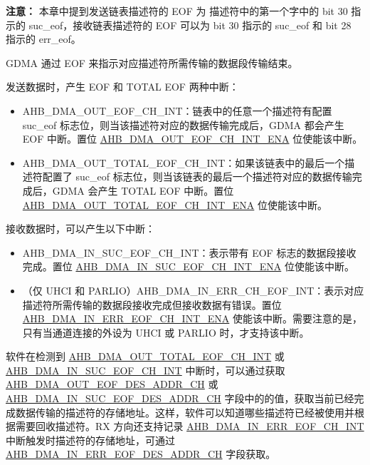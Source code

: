 \documentclass[main\_\_CN.tex]{subfiles}
\begin{document}
{\bfseries 注意：} 本章中提到发送链表描述符的 EOF 为 描述符中的第一个字中的 bit 30 指示的 suc\_eof，接收链表描述符的 EOF 可以为 bit 30 指示的 suc\_eof 和 bit 28 指示的 err\_eof。

GDMA 通过 EOF 来指示对应描述符所需传输的数据段传输结束。

发送数据时，产生 EOF 和 TOTAL EOF 两种中断：
\begin{itemize}
    \item AHB\_DMA\_OUT\_EOF\_CH\_INT：链表中的任意一个描述符有配置 suc\_eof 标志位，则当该描述符对应的数据传输完成后，GDMA 都会产生 EOF 中断。置位 \hyperref[fielddesc:AHBDMAOUTEOFCHNINTENA]{AHB\_DMA\_OUT\_EOF\_CH\_INT\_ENA} 位使能该中断。
    \item AHB\_DMA\_OUT\_TOTAL\_EOF\_CH\_INT：如果该链表中的最后一个描述符配置了 suc\_eof 标志位，则当该链表的最后一个描述符对应的数据传输完成后，GDMA 会产生 TOTAL EOF 中断。置位 \hyperref[fielddesc:AHBDMAOUTTOTALEOFCHNINTENA]{AHB\_DMA\_OUT\_TOTAL\_EOF\_CH\_INT\_ENA} 位使能该中断。
\end{itemize}


接收数据时，可以产生以下中断：
\begin{itemize}
    \item AHB\_DMA\_IN\_SUC\_EOF\_CH\_INT：表示带有 EOF 标志的数据段接收完成。置位 \hyperref[fielddesc:AHBDMAINSUCEOFCHNINTENA]{AHB\_DMA\_IN\_SUC\_EOF\_CH\_INT\_ENA} 位使能该中断。
    \item（仅 UHCI 和 PARLIO）AHB\_DMA\_IN\_ERR\_CH\_EOF\_INT：表示对应描述符所需传输的数据段接收完成但接收数据有错误。置位 \hyperref[fielddesc:AHBDMAINERREOFCHNINTENA]{AHB\_DMA\_IN\_ERR\_EOF\_CH\_INT\_ENA} 使能该中断。需要注意的是，只有当通道连接的外设为 UHCI 或 PARLIO 时，才支持该中断。
\end{itemize}


软件在检测到 \hyperref[int:GDMAOUTTOTALEOFINT]{AHB\_DMA\_OUT\_TOTAL\_EOF\_CH\_INT} 或 \hyperref[int:GDMAINSUCEOFINT]{AHB\_DMA\_IN\_SUC\_EOF\_CH\_INT} 中断时，可以通过获取 \hyperref[fielddesc:AHBDMAOUTEOFDESADDRCHN]{AHB\_DMA\_OUT\_EOF\_DES\_ADDR\_CH} 或 \hyperref[fielddesc:AHBDMAINSUCEOFDESADDRCHN]{AHB\_DMA\_IN\_SUC\_EOF\_DES\_ADDR\_CH} 字段中的的值，获取当前已经完成数据传输的描述符的存储地址。这样，软件可以知道哪些描述符已经被使用并根据需要回收描述符。RX 方向还支持记录 \hyperref[int:GDMAINERREOFINT]{AHB\_DMA\_IN\_ERR\_EOF\_CH\_INT} 中断触发时描述符的存储地址，可通过 \hyperref[fielddesc:AHBDMAINERREOFDESADDRCHN]{AHB\_DMA\_IN\_ERR\_EOF\_DES\_ADDR\_CH} 字段获取。
\end{document}
